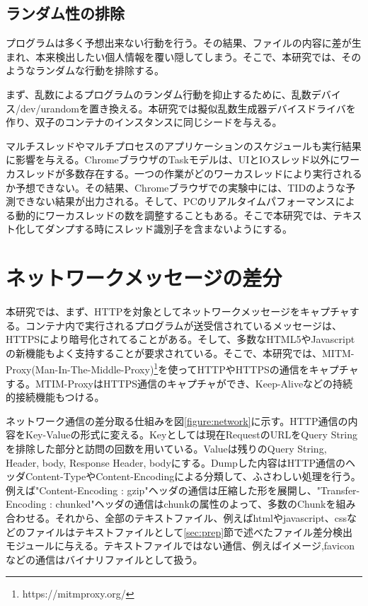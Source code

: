 \documentclass[a4paper,twocolumn,10pt]{jarticle}
\begin{document}
\subsection{ランダム性の排除}

プログラムは多く予想出来ない行動を行う。その結果、ファイルの内容に差が生まれ、本来検出したい個人情報を覆い隠してしまう。そこで、本研究では、そのようなランダムな行動を排除する。

まず、乱数によるプログラムのランダム行動を抑止するために、乱数デバイス/dev/urandomを置き換える。本研究では擬似乱数生成器デバイスドライバを作り、双子のコンテナのインスタンスに同じシードを与える。

マルチスレッドやマルチプロセスのアプリケーションのスケジュールも実行結果に影響を与える。ChromeブラウザのTaskモデルは、UIとIOスレッド以外にワーカスレッドが多数存在する。一つの作業がどのワーカスレッドにより実行されるか予想できない。その結果、Chromeブラウザでの実験中には、TIDのような予測できない結果が出力される。そして、PCのリアルタイムパフォーマンスによる動的にワーカスレッドの数を調整することもある。そこで本研究では、テキスト化してダンプする時にスレッド識別子を含まないようにする。

\section{ネットワークメッセージの差分}
\label{sec:net}
本研究では、まず、HTTPを対象としてネットワークメッセージをキャプチャする。コンテナ内で実行されるプログラムが送受信されているメッセージは、HTTPSにより暗号化されてることがある。そして、多数なHTML5やJavascriptの新機能もよく支持することが要求されている。そこで、本研究では、MITM-Proxy(Man-In-The-Middle-Proxy)\footnote{https://mitmproxy.org/}を使ってHTTPやHTTPSの通信をキャプチャする。MTIM-ProxyはHTTPS通信のキャプチャができ、Keep-Aliveなどの持続的接続機能もつける。

ネットワーク通信の差分取る仕組みを図\ref{figure:network}に示す。HTTP通信の内容をKey-Valueの形式に変える。Keyとしては現在RequestのURLをQuery Stringを排除した部分と訪問の回数を用いている。Valueは残りのQuery String, Header, body, Response Header, bodyにする。Dumpした内容はHTTP通信のヘッダContent-TypeやContent-Encodingによる分類して、ふさわしい処理を行う。例えば"Content-Encoding : gzip"ヘッダの通信は圧縮した形を展開し、"Transfer-Encoding : chunked"ヘッダの通信はchunkの属性のよって、多数のChunkを組み合わせる。それから、全部のテキストファイル、例えばhtmlやjavascript、cssなどのファイルはテキストファイルとして\ref{sec:prep}節で述べたファイル差分検出モジュールに与える。テキストファイルではない通信、例えばイメージ,faviconなどの通信はバイナリファイルとして扱う。
\end{document}
